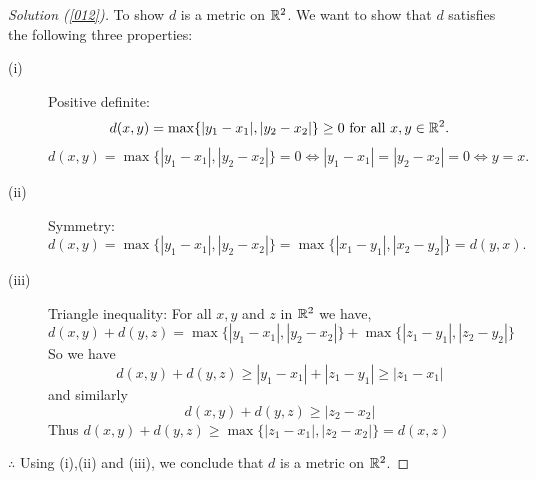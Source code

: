 \documentclass[	DIV=calc,paper=a4,fontsize=11pt]{scrartcl}	 	%
\theoremstyle{definition}
\theoremstyle{plain}
\theoremstyle{remark}
\begin{document}
\begin{proof}[Solution (\ref{012})]
To show $d$ is a metric on $\Bbb R^2$. We want to show that $d$ satisfies the following three properties:
\begin{description}
  \item[(i)] Positive definite:
\[d(x,y) = \max\{|y_1-x_1|, |y_2-x_2|\}\ge0 \text{ for all } x,y \in \Bbb R^2.\]
\[d(x,y) = \max\{|y_1-x_1|,|y_2-x_2|\} = 0\Leftrightarrow |y_1-x_1| =|y_2-x_2| = 0 \Leftrightarrow y = x.\]
  \item[(ii)] Symmetry:
\[d(x,y) = \max\{|y_1-x_1|, |y_2-x_2|\}=\max\{|x_1-y_1|, |x_2-y_2|\}=d(y,x).\]
  \item[(iii)] Triangle inequality: For all $x,y$ and $z$ in $\Bbb R^2$ we have,
\[d(x,y)+d(y,z)=\max\{|y_1-x_1|, |y_2-x_2|\}+\max\{|z_1-y_1|, |z_2-y_2|\}\]
So we have
\[d(x,y)+d(y,z)\ge |y_1-x_1|+|z_1-y_1|\ge |z_1-x_1|\]
and similarly
\[d(x,y)+d(y,z)\ge |z_2-x_2|\]
Thus $d(x,y)+d(y,z)\ge \max\{|z_1-x_1|,|z_2-x_2|\}=d(x,z)$
\end{description}
$\therefore$ Using (i),(ii) and (iii), we conclude that $d$ is a metric on $\Bbb R^2$.
\end{proof}
\end{document}
